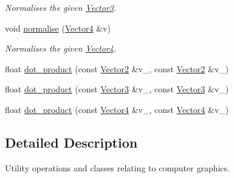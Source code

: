 \begin{DoxyCompactItemize}
\begin{DoxyCompactList}\small\item\em Normalises the given \hyperlink{classchaos_1_1gfx_1_1_vector3}{Vector3}. \end{DoxyCompactList}\item 
\hypertarget{namespacechaos_1_1gfx_ac6a7b42950415c9292e26fa3e3f668cd}{void \hyperlink{namespacechaos_1_1gfx_ac6a7b42950415c9292e26fa3e3f668cd}{normalise} (\hyperlink{classchaos_1_1gfx_1_1_vector4}{Vector4} \&v)}\label{namespacechaos_1_1gfx_ac6a7b42950415c9292e26fa3e3f668cd}

\begin{DoxyCompactList}\small\item\em Normalises the given \hyperlink{classchaos_1_1gfx_1_1_vector4}{Vector4}. \end{DoxyCompactList}\item 
float \hyperlink{namespacechaos_1_1gfx_acd651c7bb94c56e7070ca515a3515666}{dot\-\_\-product} (const \hyperlink{classchaos_1_1gfx_1_1_vector2}{Vector2} \&v\-\_, const \hyperlink{classchaos_1_1gfx_1_1_vector2}{Vector2} \&v\-\_)
\item 
float \hyperlink{namespacechaos_1_1gfx_a83b19bb75ac950fd15409cc8cb788d3b}{dot\-\_\-product} (const \hyperlink{classchaos_1_1gfx_1_1_vector3}{Vector3} \&v\-\_, const \hyperlink{classchaos_1_1gfx_1_1_vector3}{Vector3} \&v\-\_)
\item 
float \hyperlink{namespacechaos_1_1gfx_ae77430b2fa8891e2dfcbac28b85b1aad}{dot\-\_\-product} (const \hyperlink{classchaos_1_1gfx_1_1_vector4}{Vector4} \&v\-\_, const \hyperlink{classchaos_1_1gfx_1_1_vector4}{Vector4} \&v\-\_)
\end{DoxyCompactItemize}


\subsection{Detailed Description}
Utility operations and classes relating to computer graphics. 

